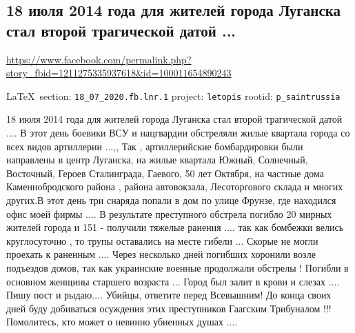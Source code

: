  
 
  
\subsection{18 июля 2014 года для жителей города Луганска стал второй трагической датой ...}
\url{https://www.facebook.com/permalink.php?story_fbid=1211275335937618&id=100011654890243}

\vspace{0.5cm}
{\small\LaTeX~section: \verb|18_07_2020.fb.lnr.1| project: \verb|letopis| rootid: \verb|p_saintrussia|}
\vspace{0.5cm}
  
18 июля 2014 года для жителей города Луганска стал второй трагической датой
.... В этот день боевики ВСУ и нацгвардии обстреляли жилые квартала города со
всех видов артиллерии ...,, Так , артиллерийские бомбардировки были направлены
в центр Луганска, на жилые квартала Южный, Солнечный, Восточный, Героев
Сталинграда, Гаевого, 50 лет Октября, на частные дома Каменнобродского района ,
района автовокзала, Лесоторгового склада и многих других.В этот день три
снаряда попали в дом по улице Фрунзе, где находился офис моей фирмы .... В
результате преступного обстрела погибло 20 мирных жителей города и 151 -
получили тяжелые ранения .... так как бомбежки велись круглосуточно , то трупы
оставались на месте гибели ... Скорые не могли проехать к раненным .... Через
несколько дней погибших хоронили возле подъездов домов, так как украинские
военные продолжали обстрелы ! Погибли в основном женщины старшего возраста ...
Город был залит в крови и слезах .... Пишу пост и рыдаю.... Убийцы, ответите
перед Всевышним! До конца своих дней буду добиваться осуждения этих
преступников Гаагским Трибуналом !!! Помолитесь, кто может о невинно убиенных
душах ....
  
  
